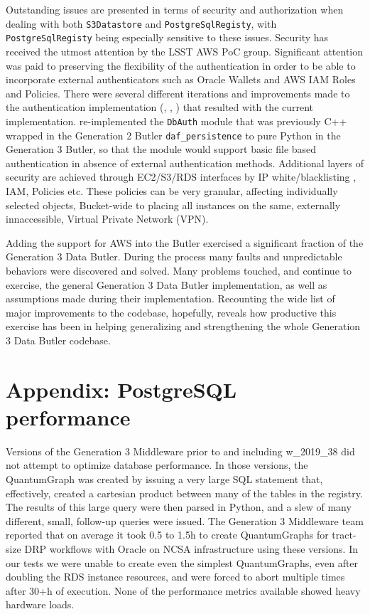 Outstanding issues are presented in terms of security and authorization when dealing with both \texttt{S3Datastore} and \texttt{PostgreSqlRegisty}, with \texttt{PostgreSqlRegisty} being especially sensitive to these issues.
Security has received the utmost attention by the LSST AWS PoC group.
Significant attention was paid to preserving the flexibility of the authentication in order to be able to incorporate external authenticators such as Oracle Wallets and AWS IAM Roles and Policies.
There were several different iterations and improvements made to the authentication implementation (, , ) that resulted with the current implementation.
 re-implemented the \texttt{DbAuth} module that was previously C++ wrapped in the Generation 2 Butler \texttt{daf\_persistence} to pure Python in the Generation 3 Butler, so that the module would support basic file based authentication in absence of external authentication methods.
Additional layers of security are achieved through EC2/S3/RDS interfaces by IP white/blacklisting , IAM, Policies etc.
These policies can be very granular, affecting individually selected objects, Bucket-wide to placing all instances on the same, externally innaccessible, Virtual Private Network (VPN).

Adding the support for AWS into the Butler exercised a significant fraction of the Generation 3 Data Butler.
During the process many faults and unpredictable behaviors were discovered and solved.
Many problems touched, and continue to exercise, the general Generation 3 Data Butler implementation, as well as assumptions made during their implementation.
Recounting the wide list of major improvements to the codebase, hopefully, reveals how productive this exercise has been in helping generalizing and strengthening the whole Generation 3 Data Butler codebase.

\section{Appendix: PostgreSQL performance}

Versions of the Generation 3 Middleware prior to and including w\_2019\_38 did not attempt to optimize database performance.
In those versions, the QuantumGraph was created by issuing a very large SQL statement that, effectively, created a cartesian product between many of the tables in the registry.
The results of this large query were then parsed in Python, and a slew of many different, small, follow-up queries were issued.
The Generation 3 Middleware team reported that on average it took 0.5 to 1.5h to create QuantumGraphs for tract-size DRP workflows with Oracle on NCSA infrastructure using these versions.
In our tests we were unable to create even the simplest QuantumGraphs, even after doubling the RDS instance resources, and were forced to abort multiple times after 30+h of execution.
None of the performance metrics available showed heavy hardware loads.

